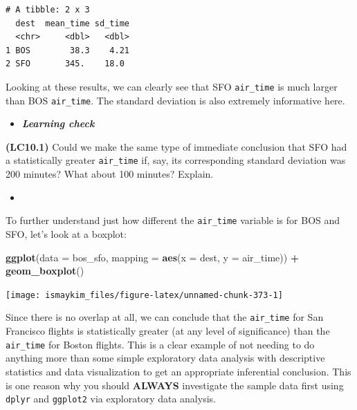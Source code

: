 \documentclass[12pt,]{krantz}
\makeatletter
\newenvironment{Shaded}{\begin{snugshade}}{\end{snugshade}}
\newcommand{\KeywordTok}[1]{\textcolor[rgb]{0.27,0.27,0.27}{\textbf{#1}}}
\newcommand{\DataTypeTok}[1]{\textcolor[rgb]{0.27,0.27,0.27}{#1}}
\newcommand{\StringTok}[1]{\textcolor[rgb]{0.5,0.5,0.5}{#1}}
\newcommand{\OperatorTok}[1]{\textcolor[rgb]{0.43,0.43,0.43}{\textbf{#1}}}
\newcommand{\NormalTok}[1]{#1}
\newenvironment{kframe}{%
\medskip{}
\setlength{\fboxsep}{.8em}
 \def\at@end@of@kframe{}%
 \ifinner\ifhmode%
  \def\at@end@of@kframe{\end{minipage}}%
  \begin{minipage}{\columnwidth}%
 \fi\fi%
 \def\FrameCommand##1{\hskip\@totalleftmargin \hskip-\fboxsep
 \colorbox{shadecolor}{##1}\hskip-\fboxsep
     \hskip-\linewidth \hskip-\@totalleftmargin \hskip\columnwidth}%
 \MakeFramed {\advance\hsize-\width
   \@totalleftmargin\z@ \linewidth\hsize
   \@setminipage}}%
 {\par\unskip\endMakeFramed%
 \at@end@of@kframe}
\renewenvironment{Shaded}{\begin{kframe}}{\end{kframe}}
\newenvironment{rmdblock}[1]
  {\begin{shaded*}
  \begin{itemize}
  \renewcommand{\labelitemi}{
    \raisebox{-.7\height}[0pt][0pt]{
    }
  }
  \item
  }
  {
  \end{itemize}
  \end{shaded*}
  }
\newenvironment{learncheck}
  {\begin{rmdblock}{warning}}
  {\end{rmdblock}}
\theoremstyle{definition}
\theoremstyle{definition}
\theoremstyle{definition}
\theoremstyle{remark}
\makeatother
\begin{document}
\begin{verbatim}
# A tibble: 2 x 3
  dest  mean_time sd_time
  <chr>     <dbl>   <dbl>
1 BOS        38.3    4.21
2 SFO       345.    18.0 
\end{verbatim}

Looking at these results, we can clearly see that SFO \texttt{air\_time}
is much larger than BOS \texttt{air\_time}. The standard deviation is
also extremely informative here.

\begin{learncheck}
\textbf{\emph{Learning check}}
\end{learncheck}

\textbf{(LC10.1)} Could we make the same type of immediate conclusion
that SFO had a statistically greater \texttt{air\_time} if, say, its
corresponding standard deviation was 200 minutes? What about 100
minutes? Explain.

\begin{learncheck}

\end{learncheck}

To further understand just how different the \texttt{air\_time} variable
is for BOS and SFO, let's look at a boxplot:

\begin{Shaded}
\begin{Highlighting}[]
\KeywordTok{ggplot}\NormalTok{(}\DataTypeTok{data =}\NormalTok{ bos_sfo, }\DataTypeTok{mapping =} \KeywordTok{aes}\NormalTok{(}\DataTypeTok{x =}\NormalTok{ dest, }\DataTypeTok{y =}\NormalTok{ air_time)) }\OperatorTok{+}
\StringTok{  }\KeywordTok{geom_boxplot}\NormalTok{()}
\end{Highlighting}
\end{Shaded}

\begin{center}\texttt{[image: ismaykim\_files/figure-latex/unnamed-chunk-373-1]} \end{center}

Since there is no overlap at all, we can conclude that the
\texttt{air\_time} for San Francisco flights is statistically greater
(at any level of significance) than the \texttt{air\_time} for Boston
flights. This is a clear example of not needing to do anything more than
some simple exploratory data analysis with descriptive statistics and
data visualization to get an appropriate inferential conclusion. This is
one reason why you should \textbf{ALWAYS} investigate the sample data
first using \texttt{dplyr} and \texttt{ggplot2} via exploratory data
analysis.
\end{document}

